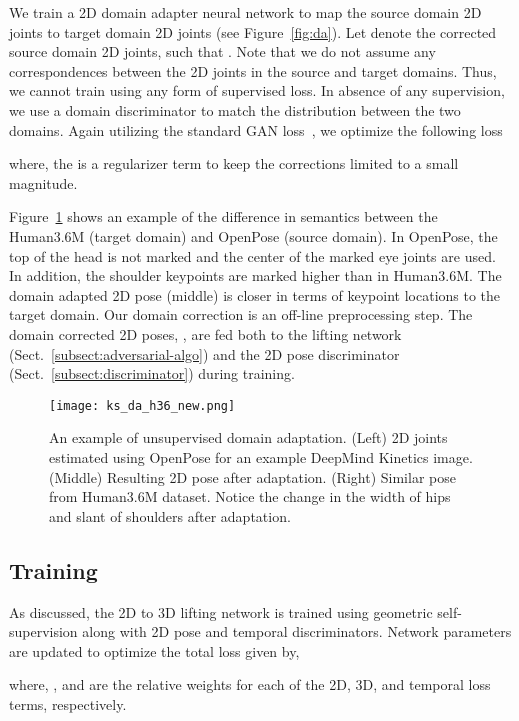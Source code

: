 \documentclass[10pt,twocolumn,letterpaper]{article}
\begin{document}
We train a 2D domain adapter neural network  to map the source domain 2D joints to target domain 2D joints (see Figure~\ref{fig:da}). Let  denote the corrected source domain 2D joints, such that . Note that we do not assume any correspondences between the 2D joints in the source and target domains. Thus, we cannot train  using any form of supervised loss. In absence of any supervision, we use a domain discriminator  to match the distribution between the two domains. Again utilizing the standard GAN loss~\cite{GAN}, we optimize the following loss


\noindent where, the  is a regularizer term to keep the corrections limited to a small magnitude.

Figure~\ref{fig:domain_corrected_examples} shows an example of the difference in semantics between the Human3.6M (target domain) and OpenPose (source domain). In OpenPose, the top of the head is not marked and the center of the marked eye joints are used. In addition, the shoulder keypoints are marked higher than in Human3.6M. The domain adapted 2D pose (middle) is closer in terms of keypoint locations to the target domain. Our domain correction is an off-line preprocessing step. The domain corrected 2D poses, , are fed both to the lifting network (Sect.~\ref{subsect:adversarial-algo}) and the 2D pose discriminator (Sect.~\ref{subsect:discriminator}) during training.


\begin{figure}[htb]
	\centering
\texttt{[image: ks\_da\_h36\_new.png]}
	\caption{An example of unsupervised domain adaptation. (Left) 2D joints estimated using OpenPose for an example DeepMind Kinetics image. (Middle) Resulting 2D pose after adaptation. (Right) Similar pose from Human3.6M dataset. Notice the change in the width of hips and slant of shoulders after adaptation.}
	\label{fig:domain_corrected_examples}
	\vspace{-3ex}
\end{figure}


\subsection{Training}
As discussed, the 2D to 3D lifting network is trained using geometric self-supervision along with 2D pose and temporal discriminators. Network parameters are updated to optimize the total loss given by,

\noindent where, , and  are the relative weights for each of the 2D, 3D, and temporal loss terms, respectively.
\end{document}
